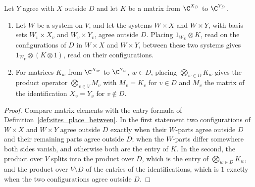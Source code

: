 \begin{lemma}
    \label{lem:sites_place_between_products}
    \leanok
    Let $Y$ agree with $X$ outside $D$ and let $K$ be a matrix from $\C^{X_D}$ to
    $\C^{Y_D}$.
    \begin{enumerate}
        \item Let $W$ be a system on $V$, and let the systems $W\times X$ and
              $W\times Y$, with basis sets $W_v\times X_v$ and $W_v\times Y_v$,
              agree outside $D$. Placing $1_{W_D}\otimes K$, read on the
              configurations of $D$ in $W\times X$ and $W\times Y$, between these
              two systems gives $1_{W_V}\otimes(K\otimes1)$, read on their
              configurations.
        \item For matrices $K_w$ from $\C^{X_w}$ to $\C^{Y_w}$, $w\in D$,
              placing $\bigotimes_{w\in D}K_w$ gives the product operator
              $\bigotimes_{v\in V}M_v$ with $M_v=K_v$ for $v\in D$ and $M_v$ the
              matrix of the identification $X_v=Y_v$ for $v\notin D$.
    \end{enumerate}
\end{lemma}
\begin{proof}\leanok
    Compare matrix elements with the entry formula of
    Definition~\ref{def:sites_place_between}. In the first statement two
    configurations of $W\times X$ and $W\times Y$ agree outside $D$ exactly when
    their $W$-parts agree outside $D$ and their remaining parts agree outside $D$;
    when the $W$-parts differ somewhere both sides vanish, and otherwise both are
    the entry of $K$. In the second, the product over $V$ splits into the product
    over $D$, which is the entry of $\bigotimes_{w\in D}K_w$, and the product over
    $V\setminus D$ of the entries of the identifications, which is $1$ exactly
    when the two configurations agree outside $D$.
\end{proof}

